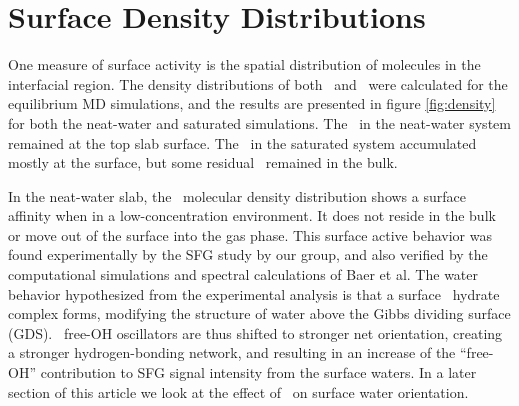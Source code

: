 \section{Surface Density Distributions}

One measure of surface activity is the spatial distribution of molecules in the interfacial region. The density distributions of both \wat~and \suldiox~were calculated for the equilibrium MD simulations, and the results are presented in figure \ref{fig:density} for both the neat-water and saturated simulations. The \suldiox~in the neat-water system remained at the top slab surface. The \suldiox~in the saturated system accumulated mostly at the surface, but some residual \suldiox~remained in the bulk.



In the neat-water slab, the \suldiox~molecular density distribution shows a surface affinity when in a low-concentration environment. It does not reside in the bulk or move out of the surface into the gas phase. This surface active behavior was found experimentally by the SFG study by our group,\cite{Tarbuck2005,Tarbuck2006} and also verified by the computational simulations and spectral calculations of Baer et al.\cite{Baer2010} The water behavior hypothesized from the experimental analysis is that a surface \suldiox~hydrate complex forms, modifying the structure of water above the Gibbs dividing surface (GDS). \wat~free-OH oscillators are thus shifted to stronger net orientation, creating a stronger hydrogen-bonding network, and resulting in an increase of the ``free-OH'' contribution to SFG signal intensity from the surface waters. In a later section of this article we look at the effect of \suldiox~on surface water orientation.

